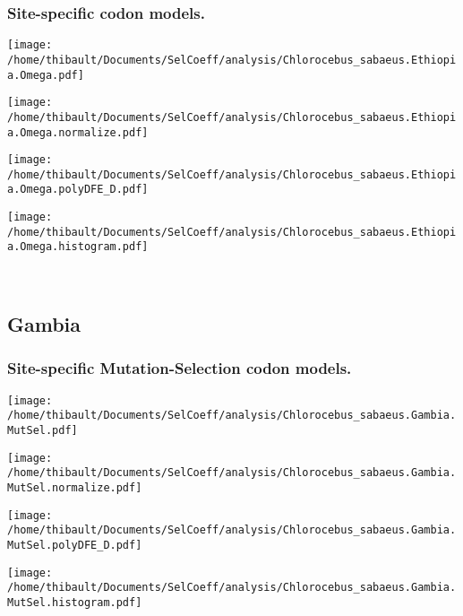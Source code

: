 \subsubsection*{Site-specific codon models.} 
\begin{minipage}{0.49\linewidth} 
\texttt{[image: /home/thibault/Documents/SelCoeff/analysis/Chlorocebus\_sabaeus.Ethiopia.Omega.pdf]} 
\end{minipage}
\begin{minipage}{0.49\linewidth} 
\texttt{[image: /home/thibault/Documents/SelCoeff/analysis/Chlorocebus\_sabaeus.Ethiopia.Omega.normalize.pdf]} 
\end{minipage}
\begin{minipage}{0.49\linewidth} 
\texttt{[image: /home/thibault/Documents/SelCoeff/analysis/Chlorocebus\_sabaeus.Ethiopia.Omega.polyDFE\_D.pdf]} 
\end{minipage}
\begin{minipage}{0.49\linewidth} 
\texttt{[image: /home/thibault/Documents/SelCoeff/analysis/Chlorocebus\_sabaeus.Ethiopia.Omega.histogram.pdf]} 
\end{minipage}
\\ 
\subsection{Gambia} 
 
\subsubsection*{Site-specific Mutation-Selection codon models.} 
\begin{minipage}{0.49\linewidth} 
\texttt{[image: /home/thibault/Documents/SelCoeff/analysis/Chlorocebus\_sabaeus.Gambia.MutSel.pdf]} 
\end{minipage}
\begin{minipage}{0.49\linewidth} 
\texttt{[image: /home/thibault/Documents/SelCoeff/analysis/Chlorocebus\_sabaeus.Gambia.MutSel.normalize.pdf]} 
\end{minipage}
\begin{minipage}{0.49\linewidth} 
\texttt{[image: /home/thibault/Documents/SelCoeff/analysis/Chlorocebus\_sabaeus.Gambia.MutSel.polyDFE\_D.pdf]} 
\end{minipage}
\begin{minipage}{0.49\linewidth} 
\texttt{[image: /home/thibault/Documents/SelCoeff/analysis/Chlorocebus\_sabaeus.Gambia.MutSel.histogram.pdf]} 
\end{minipage}
\\ 
